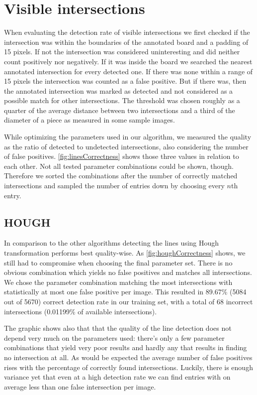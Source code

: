 	\section{Visible intersections}
	When evaluating the detection rate of visible intersections we first checked if the intersection was within the boundaries of the annotated board and a padding of 15 pixels. If not the intersection was considered uninteresting and did neither count positively nor negatively. If it was inside the board we searched the nearest annotated intersection for every detected one. If there was none within a range of 15 pixels the intersection was counted as a false positive. But if there was, then the annotated intersection was marked as detected and not considered as a possible match for other intersections. The threshold was chosen roughly as a quarter of the average distance between two intersections and a third of the diameter of a piece as measured in some sample images.

	While optimizing the parameters used in our algorithm, we measured the quality as the ratio of detected to undetected intersections, also considering the number of false positives. \ref{fig:linesCorrectness} shows those three values in relation to each other. Not all tested parameter combinations could be shown, though. Therefore we sorted the combinations after the number of correctly matched intersections and sampled the number of entries down by choosing every $n$th entry.

	\subsection{HOUGH}
	In comparison to the other algorithms detecting the lines using Hough transformation performs best quality-wise. As \ref{fig:houghCorrectness} shows, we still had to compromise when choosing the final parameter set. There is no obvious combination which yields no false positives and matches all intersections. We chose the parameter combination matching the most intersections with statistically at most one false positive per image. This resulted in 89.67\% (5084 out of 5670) correct detection rate in our training set, with a total of 68 incorrect intersections (0.01199\% of available intersections).

	The graphic shows also that that the quality of the line detection does not depend very much on the parameters used: there's only a few parameter combinations that yield very poor results and hardly any that results in finding no intersection at all. As would be expected the average number of false positives rises with the percentage of correctly found intersections. Luckily, there is enough variance yet that even at a high detection rate we can find entries with on average less than one false intersection per image.

